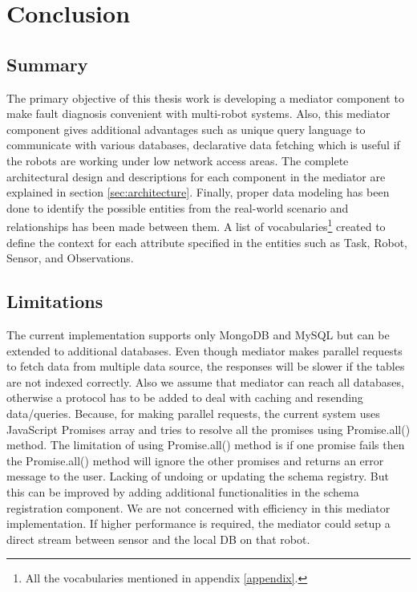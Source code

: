 

	\let\cleardoublepage\clearpage
\chapter{Conclusion} \label{sec:conclusion}

\section{Summary}

The primary objective of this thesis work is developing a mediator component to make fault diagnosis convenient with multi-robot systems. Also, this mediator component gives additional advantages such as unique query language to communicate with various databases, declarative data fetching which is useful if the robots are working under low network access areas. The complete architectural design and descriptions for each component in the mediator are explained in section \ref{sec:architecture}. Finally, proper data modeling has been done to identify the possible entities from the real-world scenario and relationships has been made between them. A list of vocabularies\footnote{All the vocabularies mentioned in appendix \ref{appendix}.} created to define the context for each attribute specified in the entities such as Task, Robot, Sensor, and Observations.

\section{Limitations}

The current implementation supports only MongoDB and MySQL but can be extended to additional databases. Even though mediator makes parallel requests to fetch data from multiple data source, the responses will be slower if the tables are not indexed correctly. Also we assume that mediator can reach all databases, otherwise a protocol has to be added to deal with caching and resending data/queries. Because, for making parallel requests, the current system uses JavaScript Promises array and tries to resolve all the promises using Promise.all() method. The limitation of using Promise.all() method is if one promise fails then the Promise.all() method will ignore the other promises and returns an error message to the user. Lacking of undoing or updating the schema registry. But this can be improved by adding additional functionalities in the schema registration component. We are not concerned with efficiency in this mediator implementation. If higher performance is required, the mediator could setup a direct stream between sensor and the local DB on that robot.


